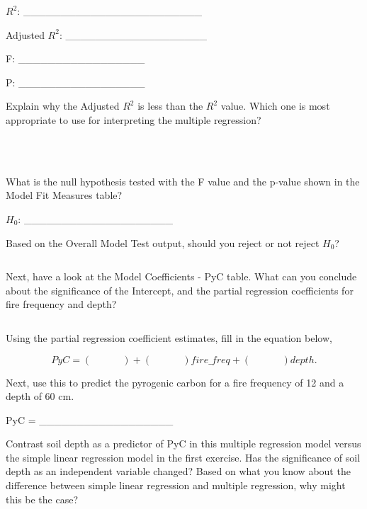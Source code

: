 \documentclass[
  openany]{krantz}
\begin{document}
\(R^{2}\): \_\_\_\_\_\_\_\_\_\_\_\_\_\_\_\_\_\_\_\_\_\_\_\_

Adjusted \(R^{2}\): \_\_\_\_\_\_\_\_\_\_\_\_\_\_\_\_\_\_\_

F: \_\_\_\_\_\_\_\_\_\_\_\_\_\_\_\_\_

P: \_\_\_\_\_\_\_\_\_\_\_\_\_\_\_\_\_

Explain why the Adjusted \(R^{2}\) is less than the \(R^{2}\) value.
Which one is most appropriate to use for interpreting the multiple regression?

\begin{verbatim}



\end{verbatim}

What is the null hypothesis tested with the F value and the p-value shown in the Model Fit Measures table?

\(H_{0}\): \_\_\_\_\_\_\_\_\_\_\_\_\_\_\_\_\_\_\_\_

Based on the Overall Model Test output, should you reject or not reject \(H_{0}\)?

\begin{verbatim}
\end{verbatim}

Next, have a look at the Model Coefficients - PyC table.
What can you conclude about the significance of the Intercept, and the partial regression coefficients for fire frequency and depth?

\begin{verbatim}

\end{verbatim}

Using the partial regression coefficient estimates, fill in the equation below,

\[PyC = (\:\:\:\:\:\:\:\:\:\:\:\:\:\:) + (\:\:\:\:\:\:\:\:\:\:\:\:\:\:)fire\_freq + (\:\:\:\:\:\:\:\:\:\:\:\:\:\:)depth.\]

Next, use this to predict the pyrogenic carbon for a fire frequency of 12 and a depth of 60 cm.

PyC = \_\_\_\_\_\_\_\_\_\_\_\_\_\_\_\_\_\_

Contrast soil depth as a predictor of PyC in this multiple regression model versus the simple linear regression model in the first exercise.
Has the significance of soil depth as an independent variable changed?
Based on what you know about the difference between simple linear regression and multiple regression, why might this be the case?
\end{document}
